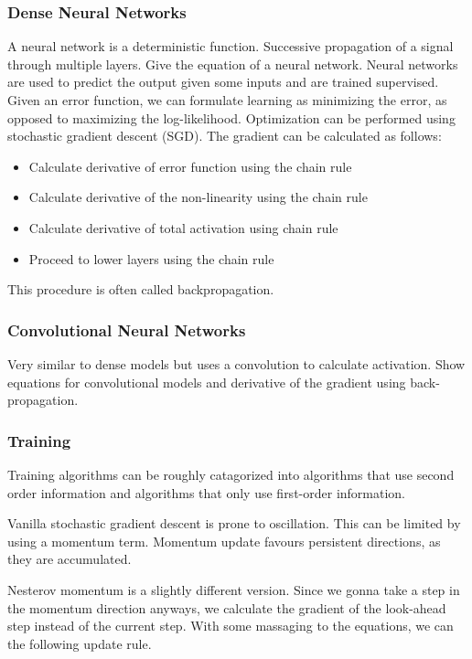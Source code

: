\documentclass{report}
\begin{document}
\subsubsection{Dense Neural Networks}

A neural network is a deterministic function. Successive propagation of a signal
through multiple layers. Give the equation of a neural network. Neural networks
are used to predict the output given some inputs and are trained supervised.
Given an error function, we can formulate learning as minimizing the error, as
opposed to maximizing the log-likelihood. Optimization can be performed using
stochastic gradient descent (SGD). The gradient can be calculated as follows:
\begin{itemize}
\item Calculate derivative of error function using the chain rule
\item Calculate derivative of the non-linearity using the chain rule
\item Calculate derivative of total activation using chain rule
\item Proceed to lower layers using the chain rule
\end{itemize}
This procedure is often called backpropagation.

\subsubsection{Convolutional Neural Networks}

Very similar to dense models but uses a convolution to calculate activation.
Show equations for convolutional models and derivative of the gradient using
back-propagation.


\subsubsection{Training}

Training algorithms can be roughly catagorized into algorithms that use second
order information and algorithms that only use first-order information.

Vanilla stochastic gradient descent is prone to oscillation. This can be limited
by using a momentum term. Momentum update favours persistent directions, as they
are accumulated.

Nesterov momentum is a slightly different version. Since we gonna take a step in
the momentum direction anyways, we calculate the gradient of the look-ahead step
instead of the current step. With some massaging to the equations, we can the
following update rule.
\end{document}
